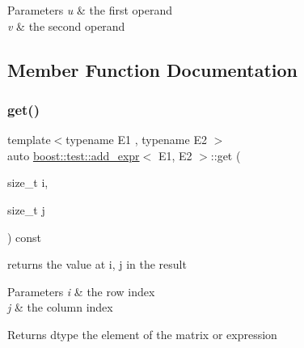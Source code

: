\begin{DoxyParams}{Parameters}
{\em u} & the first operand \\
\hline
{\em v} & the second operand \\
\hline
\end{DoxyParams}


\subsection{Member Function Documentation}
\mbox{\label{classboost_1_1test_1_1add__expr_a6425a9eb0f228262e2f7d5e2b9cb6d21}} 
\subsubsection{\texorpdfstring{get()}{get()}}
{\footnotesize\ttfamily template$<$typename E1 , typename E2 $>$ \\
auto \mbox{\hyperlink{classboost_1_1test_1_1add__expr}{boost\+::test\+::add\+\_\+expr}}$<$ E1, E2 $>$\+::get (\begin{DoxyParamCaption}\item[{size\+\_\+t}]{i,  }\item[{size\+\_\+t}]{j }\end{DoxyParamCaption}) const\hspace{0.3cm}{\ttfamily [inline]}}



returns the value at i, j in the result 


\begin{DoxyParams}{Parameters}
{\em i} & the row index \\
\hline
{\em j} & the column index \\
\hline
\end{DoxyParams}
\begin{DoxyReturn}{Returns}
dtype the element of the matrix or expression 
\end{DoxyReturn}
\mbox{\label{classboost_1_1test_1_1add__expr_aff48943113526440d4cae9b62492092f}} 
